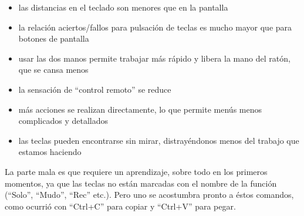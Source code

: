 \begin{itemize}
 \item las distancias en el teclado son menores que en la pantalla
 \item la relación aciertos/fallos para pulsación de teclas es mucho mayor que para botones de pantalla
 \item usar las dos manos permite trabajar más rápido y libera la mano del ratón, que se cansa menos
 \item la sensación de ``control remoto'' se reduce
 \item más acciones se realizan directamente, lo que permite menús menos complicados y detallados
 \item las teclas pueden encontrarse sin mirar, distrayéndonos menos del trabajo que estamos haciendo
\end{itemize}

La parte mala es que requiere un aprendizaje, sobre todo en los primeros momentos, ya que las teclas no están marcadas con el nombre de la función (``Solo'', ``Mudo'', ``Rec'' etc.). Pero uno se acostumbra pronto a éstos comandos, como ocurrió con ``Ctrl+C'' para copiar y ``Ctrl+V'' para pegar.


